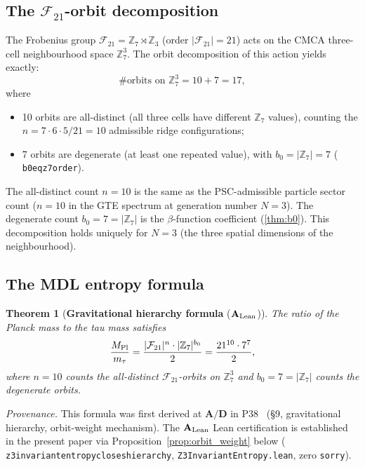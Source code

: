 \documentclass[11pt]{article}
\newtheorem{theorem}{Theorem}[section]
\theoremstyle{remark}
\newcommand{\ZS}{\mathbb{Z}_7}
\newcommand{\ZZ}{\mathbb{Z}}
\newcommand{\lean}[1]{%
  \penalty-100
  \begingroup\def\_{\textunderscore\allowbreak}\texttt{#1}\endgroup}
\newcommand{\FTT}{\mathcal{F}_{21}}
\newcommand{\CatAL}{\ensuremath{\textbf{A}_{\rm Lean}}}
\newcommand{\CatAD}{\textbf{A/D}}
\begin{document}
\subsection{The \texorpdfstring{$\mathcal{F}_{21}$}{F21}-orbit decomposition}

The Frobenius group $\FTT = \ZS \rtimes \ZZ_3$ (order $|{\FTT}| = 21$)
acts on the CMCA three-cell neighbourhood space $\ZS^3$.  The orbit
decomposition of this action yields exactly:
\begin{equation}
  \#\text{orbits on }\ZS^3 = 10 + 7 = 17,
  \label{eq:orbit_decomp}
\end{equation}
where
\begin{itemize}[noitemsep]
\item 10 orbits are all-distinct (all three cells have different $\ZS$ values),
  counting the $n = 7\cdot6\cdot5/21 = 10$ admissible ridge configurations;
\item 7 orbits are degenerate (at least one repeated value), with
  $b_0 = |\ZS| = 7$ (\lean{b0\_eq\_z7\_order}).
\end{itemize}

The all-distinct count $n = 10$ is the same as the PSC-admissible particle
sector count ($n = 10$ in the GTE spectrum at generation number $N = 3$).
The degenerate count $b_0 = 7 = |\ZS|$ is the $\beta$-function coefficient
(\cref{thm:b0}).  This decomposition holds uniquely for $N=3$
(the three spatial dimensions of the neighbourhood).

\subsection{The MDL entropy formula}

\begin{theorem}[\textbf{Gravitational hierarchy formula} ($\CatAL$)]
\label{thm:hierarchy}
The ratio of the Planck mass to the tau mass satisfies
\begin{equation}
  \frac{M_{\rm Pl}}{m_\tau}
  = \frac{|\FTT|^n \cdot |\ZS|^{b_0}}{2}
  = \frac{21^{10} \cdot 7^7}{2},
  \label{eq:hierarchy}
\end{equation}
where $n=10$ counts the all-distinct $\FTT$-orbits on $\ZS^3$ and
$b_0 = 7 = |\ZS|$ counts the degenerate orbits.
\end{theorem}

\noindent\textit{Provenance.}
This formula was first derived at $\CatAD$ in P38~\cite{SpivackPhiMDLGravity}
(\S9, gravitational hierarchy, orbit-weight mechanism).
The $\CatAL$ Lean certification is established in the present paper via
Proposition~\ref{prop:orbit_weight} below
(\lean{z3\_invariant\_entropy\_closes\_hierarchy}, \lean{Z3InvariantEntropy.lean},
zero \texttt{sorry}).
\end{document}
